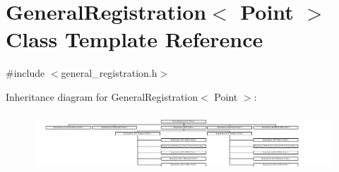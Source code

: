 \hypertarget{classGeneralRegistration}{
\section{GeneralRegistration$<$ Point $>$ Class Template Reference}
\label{classGeneralRegistration}
}


{\ttfamily \#include $<$general\_\-registration.h$>$}

Inheritance diagram for GeneralRegistration$<$ Point $>$:\begin{figure}[H]
\begin{center}
\leavevmode
\includegraphics[height=2.202557cm]{classGeneralRegistration}
\end{center}
\end{figure}
